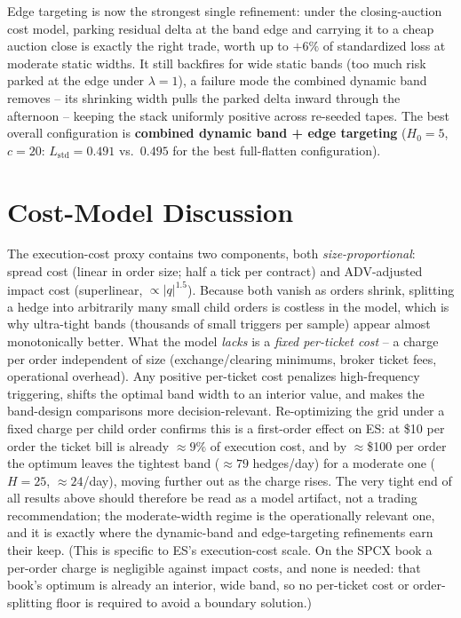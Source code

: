 \documentclass[11pt]{article}
\begin{document}
Edge targeting is now the strongest single refinement: under the closing-auction cost
model, parking residual delta at the band edge and carrying it to a cheap auction close
is exactly the right trade, worth up to $+6\%$ of standardized loss at moderate static
widths. It still backfires for wide static bands (too much risk parked at the edge
under $\lambda = 1$), a failure mode the combined dynamic band removes -- its shrinking
width pulls the parked delta inward through the afternoon -- keeping the stack uniformly
positive across re-seeded tapes. The best overall configuration is
\textbf{combined dynamic band + edge targeting} ($H_0 = 5$, $c = 20$:
$L_{\text{std}} = 0.491$ vs.\ $0.495$ for the best full-flatten configuration).

\section{Cost-Model Discussion}

The execution-cost proxy contains two components, both \emph{size-proportional}:
spread cost (linear in order size; half a tick per contract) and ADV-adjusted impact
cost (superlinear, $\propto \lvert q\rvert^{1.5}$). Because both vanish as orders
shrink, splitting a hedge into arbitrarily many small child orders is costless in the
model, which is why ultra-tight bands (thousands of small triggers per sample) appear
almost monotonically better. What the model \emph{lacks} is a \emph{fixed per-ticket
cost} -- a charge per order independent of size (exchange/clearing minimums, broker
ticket fees, operational overhead). Any positive per-ticket cost penalizes
high-frequency triggering, shifts the optimal band width to an interior value, and
makes the band-design comparisons more decision-relevant. Re-optimizing the grid under
a fixed charge per child order confirms this is a first-order effect on ES: at
\$10 per order the ticket bill is already $\approx 9\%$ of execution cost, and by
$\approx$\$100 per order the optimum leaves the tightest band ($\approx 79$ hedges/day)
for a moderate one ($H = 25$, $\approx 24$/day), moving further out as the charge rises.
The very tight end of all results above should therefore be read as a model artifact, not
a trading recommendation; the moderate-width regime is the operationally relevant one, and
it is exactly where the dynamic-band and edge-targeting refinements earn their keep.
(This is specific to ES's execution-cost scale. On the SPCX book a per-order charge is
negligible against impact costs, and none is needed: that book's optimum is already an
interior, wide band, so no per-ticket cost or order-splitting floor is required to avoid a
boundary solution.)
\end{document}
